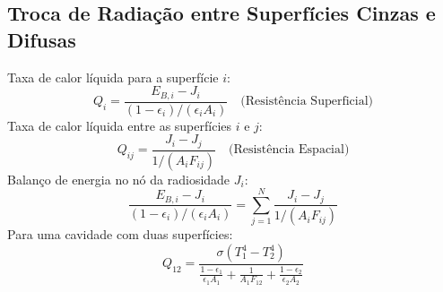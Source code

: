 \documentclass[12pt, a4paper]{article}
\begin{document}
\subsection{Troca de Radiação entre Superfícies Cinzas e Difusas}
Taxa de calor líquida para a superfície $i$:
\begin{equation}
    Q_i = \frac{E_{B,i} - J_i}{(1-\epsilon_i) / (\epsilon_i A_i)} \quad \text{(Resistência Superficial)}
\end{equation}
Taxa de calor líquida entre as superfícies $i$ e $j$:
\begin{equation}
    Q_{ij} = \frac{J_i - J_j}{1 / (A_i F_{ij})} \quad \text{(Resistência Espacial)}
\end{equation}
Balanço de energia no nó da radiosidade $J_i$:
\begin{equation}
    \frac{E_{B,i} - J_i}{(1-\epsilon_i) / (\epsilon_i A_i)} = \sum_{j=1}^{N} \frac{J_i - J_j}{1 / (A_i F_{ij})}
\end{equation}
Para uma cavidade com duas superfícies:
\begin{equation}
    Q_{12} = \frac{\sigma(T_1^4 - T_2^4)}{\frac{1-\epsilon_1}{\epsilon_1 A_1} + \frac{1}{A_1 F_{12}} + \frac{1-\epsilon_2}{\epsilon_2 A_2}}
\end{equation}
\end{document}
